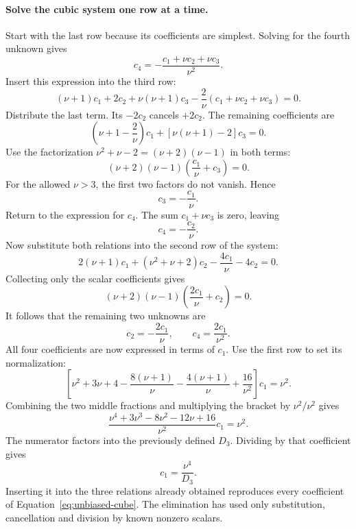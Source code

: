 \documentclass[11pt]{article}
\begin{document}
\paragraph{Solve the cubic system one row at a time.}
Start with the last row because its coefficients are simplest. Solving
for the fourth unknown gives
\begin{equation}
 c_4=-\frac{c_1+\nu c_2+\nu c_3}{\nu^2}.
\end{equation}
Insert this expression into the third row:
\begin{equation}
 (\nu+1)c_1+2c_2+\nu(\nu+1)c_3
 -\frac2\nu(c_1+\nu c_2+\nu c_3)=0.
\end{equation}
Distribute the last term. Its $-2c_2$ cancels $+2c_2$. The remaining
coefficients are
\begin{equation}
 \left(\nu+1-\frac2\nu\right)c_1
 +\left[\nu(\nu+1)-2\right]c_3=0.
\end{equation}
Use the factorization $\nu^2+\nu-2=(\nu+2)(\nu-1)$ in both terms:
\begin{equation}
 (\nu+2)(\nu-1)\left(\frac{c_1}{\nu}+c_3\right)=0.
\end{equation}
For the allowed $\nu>3$, the first two factors do not vanish. Hence
\begin{equation}
 c_3=-\frac{c_1}{\nu}.
\end{equation}
Return to the expression for $c_4$. The sum $c_1+\nu c_3$ is zero,
leaving
\begin{equation}
 c_4=-\frac{c_2}{\nu}.
\end{equation}
Now substitute both relations into the second row of the system:
\begin{equation}
 2(\nu+1)c_1+(\nu^2+\nu+2)c_2
 -\frac{4c_1}{\nu}-4c_2=0.
\end{equation}
Collecting only the scalar coefficients gives
\begin{equation}
 (\nu+2)(\nu-1)\left(\frac{2c_1}{\nu}+c_2\right)=0.
\end{equation}
It follows that the remaining two unknowns are
\begin{equation}
 c_2=-\frac{2c_1}{\nu},\qquad c_4=\frac{2c_1}{\nu^2}.
\end{equation}
All four coefficients are now expressed in terms of $c_1$. Use the first
row to set its normalization:
\begin{equation}
 \left[\nu^2+3\nu+4-\frac{8(\nu+1)}\nu
       -\frac{4(\nu+1)}\nu+\frac{16}{\nu^2}\right]c_1=\nu^2.
\end{equation}
Combining the two middle fractions and multiplying the bracket by
$\nu^2/\nu^2$ gives
\begin{equation}
 \frac{\nu^4+3\nu^3-8\nu^2-12\nu+16}{\nu^2}c_1=\nu^2.
\end{equation}
The numerator factors into the previously defined $D_3$. Dividing by
that coefficient gives
\begin{equation}
 c_1=\frac{\nu^4}{D_3}.
\end{equation}
Inserting it into the three relations already obtained reproduces every
coefficient of Equation~\eqref{eq:unbiased-cube}. The elimination has used
only substitution, cancellation and division by known nonzero scalars.
\end{document}
